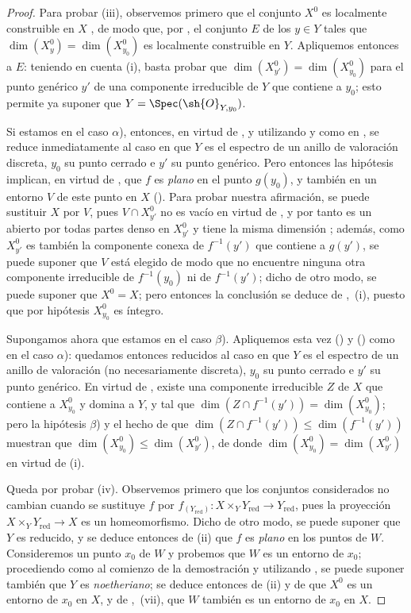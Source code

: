 \begin{proof}
Para probar (iii), observemos primero que el conjunto $X^0$ es localmente construible en $X$ , de modo que, por , el conjunto $E$ de los $y\in Y$ tales que $\dim(X_y^0)=\dim(X_{y_0}^0)$ es localmente construible en $Y$.
Apliquemos entonces  a $E$: teniendo en cuenta (i), basta probar que $\dim(X_{y'}^0)=\dim(X_{y_0}^0)$ para el punto genérico $y'$ de una componente irreducible de $Y$ que contiene a $y_0$; esto permite ya suponer que $Y=\Spec(\sh{O}_{Y,y_0})$.

Si estamos en el caso $\alpha$), entonces, en virtud de , y utilizando  y  como en , se reduce inmediatamente al caso en que $Y$ es el espectro de un anillo de valoración discreta, $y_0$ su punto cerrado e $y'$ su punto genérico.
Pero entonces las hipótesis implican, en virtud de , que $f$ es \emph{plano} en el punto $g(y_0)$, y también en un entorno $V$ de este punto en $X$ ().
Para probar nuestra afirmación, se puede sustituir $X$ por $V$, pues $V\cap X_{y'}^0$ no es vacío en virtud de , y por tanto es un abierto por todas partes denso en $X_{y'}^0$ y tiene la misma dimensión ; además, como $X_{y'}^0$ es también la componente conexa de $f^{-1}(y')$ que contiene a $g(y')$, se puede suponer que $V$ está elegido de modo que no encuentre ninguna otra componente irreducible de $f^{-1}(y_0)$ ni de $f^{-1}(y')$; dicho de otro modo, se puede suponer que $X^0=X$; pero entonces la conclusión se deduce de ,~(i), puesto que por hipótesis $X_{y_0}^0$ es íntegro.

Supongamos ahora que estamos en el caso $\beta$).
Apliquemos esta vez () y () como en el caso $\alpha$): quedamos entonces reducidos al caso en que $Y$ es el espectro de un anillo de valoración (no necesariamente discreta), $y_0$ su punto cerrado e $y'$ su punto genérico.
En virtud de , existe una componente irreducible $Z$ de $X$ que contiene a $X_{y_0}^0$ y domina a $Y$, y tal que $\dim(Z\cap f^{-1}(y'))=\dim(X_{y_0}^0)$; pero la hipótesis $\beta$) y el hecho de que $\dim(Z\cap f^{-1}(y'))\leq\dim(f^{-1}(y'))$ muestran que $\dim(X_{y_0}^0)\leq\dim(X_{y'}^0)$, de donde $\dim(X_{y_0}^0)=\dim(X_{y'}^0)$ en virtud de (i).

Queda por probar (iv).
Observemos primero que los conjuntos considerados no cambian cuando se sustituye $f$ por $f_{(Y_\mathrm{red})}:X\times_Y Y_\mathrm{red}\to Y_\mathrm{red}$, pues la proyección $X\times_Y Y_\mathrm{red}\to X$ es un homeomorfismo.
Dicho de otro modo, se puede suponer que $Y$ es reducido, y se deduce entonces de (ii) que $f$ es \emph{plano} en los puntos de $W$.
Consideremos un punto $x_0$ de $W$ y probemos que $W$ es un entorno de $x_0$; procediendo como al comienzo de la demostración y utilizando , se puede suponer también que $Y$ es \emph{noetheriano}; se deduce entonces de (ii) y de  que $X^0$ es un entorno de $x_0$ en $X$, y de ,~(vii), que $W$ también es un entorno de $x_0$ en $X$.
\end{proof}


